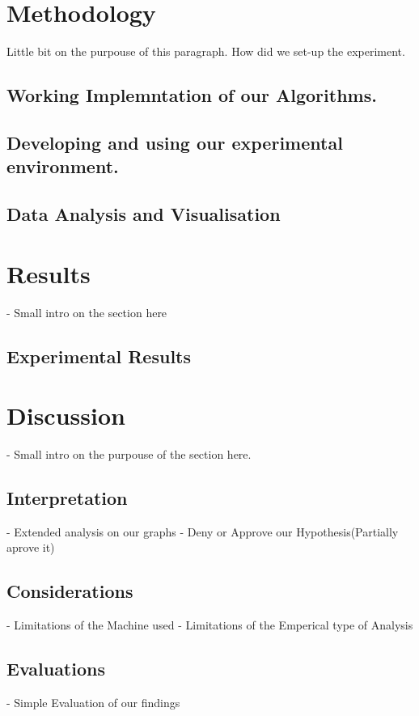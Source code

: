 \documentclass[]{report}
\begin{document}
\section{Methodology}
	Little bit on the purpouse of this paragraph.
	How did we set-up the experiment.
	\subsection{Working Implemntation of our Algorithms.}
	\subsection{Developing and using our experimental environment.}
	\subsection{Data Analysis and Visualisation}
\lipsum
\section{Results}
- Small intro on the section here
\subsection{Experimental Results}
\newpage	
\section{Discussion}
- Small intro on the purpouse of the section here.
\subsection{Interpretation}
- Extended analysis on our graphs
- Deny or Approve our Hypothesis(Partially aprove it)
\subsection{Considerations}
- Limitations of the Machine used
- Limitations of the Emperical type of Analysis
\subsection{Evaluations}
- Simple Evaluation of our findings
\end{document}
